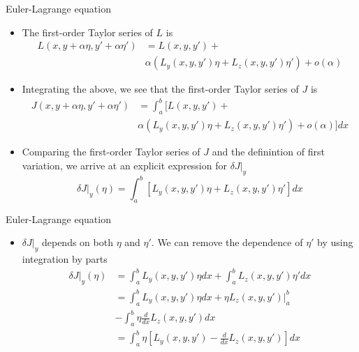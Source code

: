 \documentclass{beamer}
\begin{document}
\begin{frame}{Euler-Lagrange equation}
    \begin{itemize}
        \item The first-order Taylor series of $L$ is
        \begin{align*}
            L(x, y + \alpha \eta, y' + \alpha \eta') &= L(x, y, y') +\\
            & \alpha (L_y(x, y, y')\eta + L_z(x, y, y')\eta') + o(\alpha)
        \end{align*}
        \item Integrating the above, we see that the first-order Taylor series of $J$ is
        \begin{align*}
            J(x, y + \alpha \eta, y' + \alpha \eta') &= \int_a^b [L(x, y, y') +\\
            & \alpha (L_y(x, y, y')\eta + L_z(x, y, y')\eta') + o(\alpha)]dx
        \end{align*}
        \item Comparing the first-order Taylor series of $J$ and the definintion of first variation, we arrive at an explicit expression for $\delta J\vert_y$
        \begin{equation*}
            \delta J\vert_y (\eta) = \int_a^b [L_y(x, y, y')\eta + L_z(x, y, y')\eta']dx
        \end{equation*}
    \end{itemize}
\end{frame}

\begin{frame}{Euler-Lagrange equation}
\begin{itemize}
    \item $\delta J \vert_y$ depends on both $\eta$ and $\eta'$. We can remove the dependence of $\eta'$ by using integration by parts
    \begin{align*}
        \delta J\vert_y (\eta) &= \int_a^b L_y(x, y, y')\eta dx + \int_a^b L_z(x, y, y')\eta'dx \\
        &= \int_a^b L_y(x, y, y')\eta dx + \eta L_z(x, y, y')\vert_a^b \\
        &- \int_a^b \eta \frac{d}{dx}L_z(x, y, y')dx \\
        &= \int_a^b \eta[L_y(x, y, y') - \frac{d}{dx}L_z(x, y, y')] dx
    \end{align*}
\end{itemize}
\end{frame}
\end{document}
